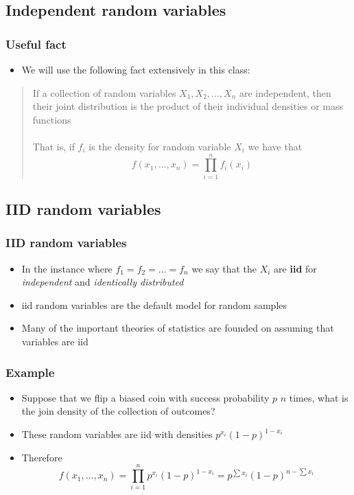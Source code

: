 \documentclass[aspectratio=169]{beamer}
\begin{document}
\subsection{Independent random variables}
\begin{frame}\frametitle{Useful fact}
  \begin{itemize}
  \item   We will use the following fact extensively in this class:
  \end{itemize}
  \begin{quote}
    If a collection of random variables $X_1, X_2, \ldots, X_n$ are
    independent, then their joint distribution is the product of their
    individual densities or mass functions \ \\ \ \\
    
    That is, if $f_i$ is the
    density for random variable $X_i$ we have that
    $$
    f(x_1,\ldots, x_n) = \prod_{i=1}^n f_i(x_i)
    $$
      \end{quote}
\end{frame}


\subsection{IID random variables}
\begin{frame}\frametitle{IID random variables}
  \begin{itemize}
  \item In the instance where $f_1 = f_2 = \ldots = f_n$ we say that the $X_i$ are {\bf iid}
    for {\em independent} and {\em identically distributed}
  \item iid random variables are the default model for random samples
  \item Many of the important theories of statistics are founded on assuming that
    variables are iid
  \end{itemize}
\end{frame}


\begin{frame}
  \frametitle{Example}
  \begin{itemize}
  \item Suppose that we flip a biased coin with success probability $p$ $n$
  times, what is the join density of the collection of
  outcomes?
  \item These random variables are iid with densities $p^{x_i} (1 - p)^{1-x_i}$ 
  \item Therefore
  $$
  f(x_1,\ldots,x_n) = \prod_{i=1}^n p^{x_i} (1 - p)^{1-x_i} = p^{\sum x_i} (1 - p)^{n - \sum x_i}
  $$
\end{itemize}
\end{frame}
\end{document}
